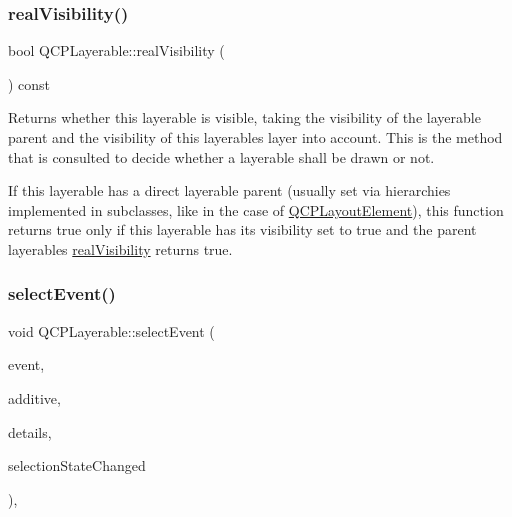 \mbox{\label{class_q_c_p_layerable_ab054e88f15d485defcb95e7376f119e7}} 
\subsubsection{\texorpdfstring{real\+Visibility()}{realVisibility()}}
{\footnotesize\ttfamily bool Q\+C\+P\+Layerable\+::real\+Visibility (\begin{DoxyParamCaption}{ }\end{DoxyParamCaption}) const}

Returns whether this layerable is visible, taking the visibility of the layerable parent and the visibility of this layerable\textquotesingle{}s layer into account. This is the method that is consulted to decide whether a layerable shall be drawn or not.

If this layerable has a direct layerable parent (usually set via hierarchies implemented in subclasses, like in the case of \hyperlink{class_q_c_p_layout_element}{Q\+C\+P\+Layout\+Element}), this function returns true only if this layerable has its visibility set to true and the parent layerable\textquotesingle{}s \hyperlink{class_q_c_p_layerable_ab054e88f15d485defcb95e7376f119e7}{real\+Visibility} returns true. \mbox{\label{class_q_c_p_layerable_a7498c2d0d081cf7cad0fb3bb93aa0e91}} 
\subsubsection{\texorpdfstring{select\+Event()}{selectEvent()}}
{\footnotesize\ttfamily void Q\+C\+P\+Layerable\+::select\+Event (\begin{DoxyParamCaption}\item[{Q\+Mouse\+Event $\ast$}]{event,  }\item[{bool}]{additive,  }\item[{const Q\+Variant \&}]{details,  }\item[{bool $\ast$}]{selection\+State\+Changed }\end{DoxyParamCaption})\hspace{0.3cm}{\ttfamily [protected]}, {\ttfamily [virtual]}}



